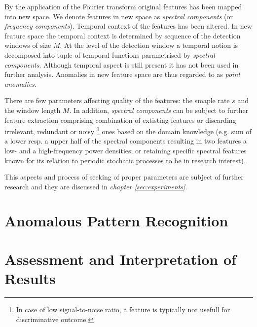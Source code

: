 By the application of the Fourier transform original features has been mapped into new space.
We denote features in new space as \emph{spectral components} (or \emph{frequency components}).
Temporal context of the features has been altered. 
In new feature space the temporal context is determined by sequence
of the detection windows of size $M$. 
At the level of the detection window a temporal notion is decomposed 
into tuple of temporal functions parametrised by \emph{spectral components}.
Although temporal aspect is still present it has not been used in further analysis.
Anomalies in new feature space are thus regarded to as \emph{point anomalies}. %

There are few parameters affecting quality of the  features: %
the smaple rate $s$ and the window length $M$. 
In addition, \emph{spectral components} can be subject to further feature extraction 
comprising combination of extisting features or discarding irrelevant, 
redundant  or noisy%
\footnote{In case of low signal-to-noise ratio, a feature is typically not usefull 
for discriminative outcome.}%
ones based on the domain knowledge (e.g. sum of a lower resp. a upper half of the 
spectral components resulting in two features a low- and a high-frequency power densities;
or retaining specific spectral features known for its relation to 
periodic stochatic processes to be in research interest).

This aspects and process of seeking of proper parameters are subject of further 
research and they are discussed in \emph{chapter \ref{sec:experiments}}.

\section{Anomalous Pattern Recognition}

\section{Assessment and Interpretation of Results}
